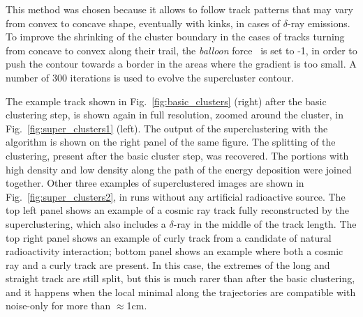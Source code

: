 This method was chosen because it allows to follow track patterns
that may vary from convex to concave shape, eventually with kinks, \eg
in cases of $\delta$-ray emissions. To improve the shrinking of the
cluster boundary in the cases of tracks turning from concave to convex
along their trail, the \textit{balloon} force~\cite{mgac} is set to
-1, in order to push the contour towards a border in the areas where
the gradient is too small. A number of 300 iterations is used to
evolve the supercluster contour.

The example track shown in Fig.~\ref{fig:basic_clusters} (right) after
the basic clustering step, is shown again in full resolution, zoomed
around the cluster, in Fig.~\ref{fig:super_clusters1} (left). The
output of the superclustering with the \gac algorithm is shown on the
right panel of the same figure. The splitting of the clustering,
present after the basic cluster step, was recovered. The portions with
high density and low density along the path of the energy deposition
were joined together. Other three examples of superclustered images are
shown in Fig.~\ref{fig:super_clusters2}, in runs without any artificial
radioactive source. The top left panel shows an example of a cosmic
ray track fully reconstructed by the \gac superclustering, which also
includes a $\delta$-ray in the middle of the track length. The top
right panel shows an example of curly track from a candidate of
natural radioactivity interaction; bottom panel shows an example where
both a cosmic ray and a curly track are present. In this case, the
extremes of the long and straight track are still split, but this is
much rarer than after the basic clustering, and it happens when the
local minimal along the trajectories are compatible with noise-only
for more than $\approx$1\unit{cm}.
%
